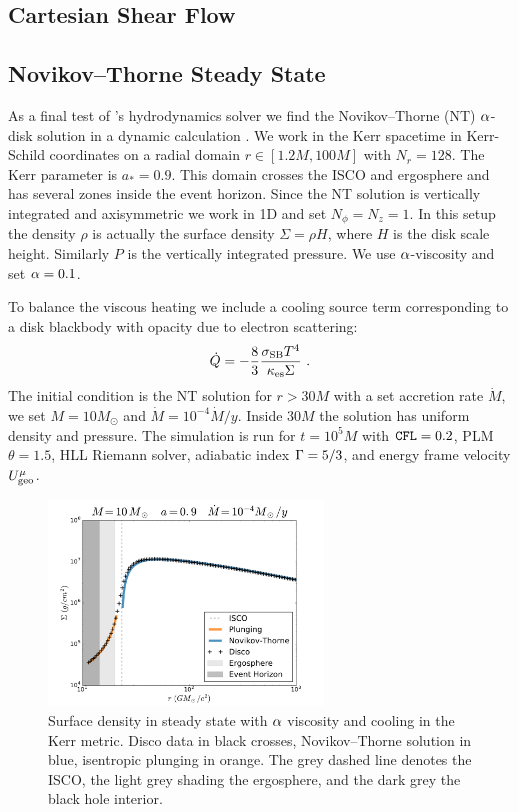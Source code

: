 \subsection{Cartesian Shear Flow}
\subsection{Novikov--Thorne Steady State}

As a final test of \grdisco's hydrodynamics solver we find the Novikov--Thorne (NT) $\alpha$-disk solution in a dynamic calculation \citep{Novikov73}.  We work in the Kerr spacetime in Kerr-Schild coordinates on a radial domain $r \in [1.2M, 100M]$ with $N_r = 128$.  The Kerr parameter is $a_* =0.9$.   This domain crosses the ISCO and ergosphere and has several zones inside the event horizon.  Since the NT solution is vertically integrated and axisymmetric we work in 1D and set $N_\phi = N_z = 1$.  In this setup the density $\rho$ is actually the surface density $\Sigma = \rho H$, where $H$ is the disk scale height.  Similarly $P$ is the vertically integrated pressure.  We use $\alpha$-viscosity and set $\alpha = 0.1$.  

To balance the viscous heating we include a cooling source term corresponding to a disk blackbody with opacity due to electron scattering:
\begin{equation}
	\dot{Q} = -\frac{8}{3}\frac{ \sigma_{\rm SB}T^4}{\kappa_{\rm es} \Sigma}\ .
\end{equation}
The initial condition is the NT solution for $r>30M$ with a set accretion rate $\dot{M}$, we set $M = 10 M_\odot$ and $\dot{M} = 10^{-4} \dot{M}/y$.  Inside $30M$ the solution has uniform density and pressure.  The simulation is run for $t = 10^5 M$ with $\mathtt{CFL}=0.2$, PLM $\theta=1.5$, HLL Riemann solver, adiabatic index $\Gamma = 5/3$, and energy frame velocity $U^\mu_{\rm geo}$. 

\begin{figure}
\begin{center}
	\includegraphics[width=0.65\textwidth]{figures/numerics/nt_sig.pdf}
\end{center}
\caption{Surface density in steady state with $\alpha$ viscosity and cooling in the Kerr metric.  Disco data in black crosses, Novikov--Thorne solution in blue, isentropic plunging in orange.  The grey dashed line denotes the ISCO, the light grey shading the ergosphere, and the dark grey the black hole interior.  }
\end{figure}


